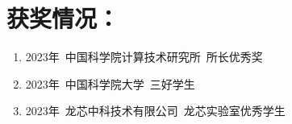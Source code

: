 \section*{获奖情况：}
\begin{enumerate}[nosep]
    \item 2023年\ 中国科学院计算技术研究所\ 所长优秀奖
    \item 2023年\ 中国科学院大学\ 三好学生
    \item 2023年\ 龙芯中科技术有限公司\ 龙芯实验室优秀学生
\end{enumerate}

\cleardoublepage[plain]%
